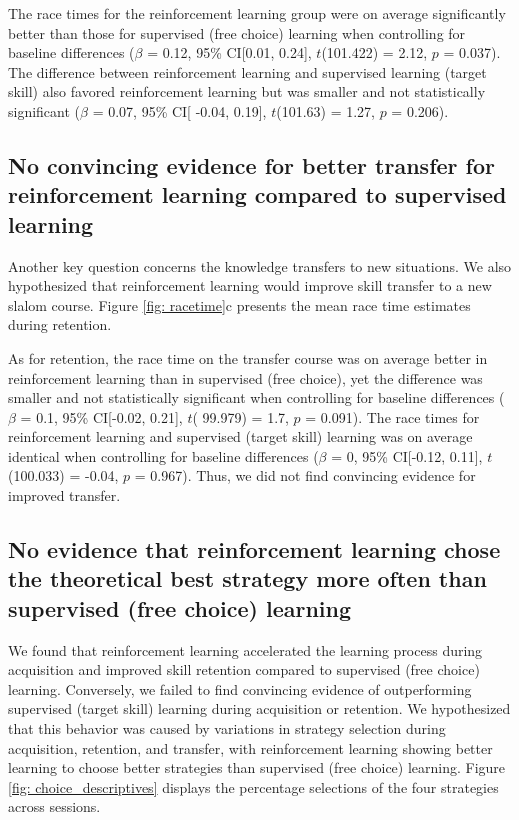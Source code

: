 \documentclass[pdflatex,sn-mathphys-num]{sn-jnl}%
\theoremstyle{thmstyleone}%
\theoremstyle{thmstyletwo}%
\theoremstyle{thmstylethree}%
\begin{document}
The race times for the reinforcement learning group were on average significantly better than those for supervised (free choice) learning when controlling for baseline differences ($\beta$ = 0.12, 95\% CI[0.01, 0.24], $t$(101.422) = 2.12, $p$ = 0.037). The difference between reinforcement learning and supervised learning (target skill) also favored reinforcement learning but was smaller and not statistically significant ($\beta$ = 0.07, 95\% CI[ -0.04, 0.19], $t$(101.63) = 1.27, $p$ = 0.206). 

\subsection{No convincing evidence for better transfer for reinforcement learning compared to supervised learning} \label{result_racetime_transfer}
Another key question concerns the knowledge transfers to new situations. We also hypothesized that reinforcement learning would improve skill transfer to a new slalom course. Figure \ref{fig: racetime}c presents the mean race time estimates during retention.

As for retention, the race time on the transfer course was on average better in reinforcement learning than in supervised (free choice), yet the difference was smaller and not statistically significant when controlling for baseline differences ($\beta$ = 0.1, 95\% CI[-0.02, 0.21], $t$( 99.979) = 1.7, $p$  = 0.091). The race times for reinforcement learning and supervised (target skill) learning was on average identical when controlling for baseline differences ($\beta$ = 0, 95\% CI[-0.12, 0.11], $t$(100.033) = -0.04, $p$ = 0.967). Thus, we did not find convincing evidence for improved transfer.


\subsection{No evidence that reinforcement learning chose the theoretical best strategy more often than supervised (free choice) learning}\label{subsubsec3}
We found that reinforcement learning accelerated the learning process during acquisition and improved skill retention compared to supervised (free choice) learning. Conversely, we failed to find convincing evidence of outperforming supervised (target skill) learning during acquisition or retention. We hypothesized that this behavior was caused by variations in strategy selection during acquisition, retention, and transfer, with reinforcement learning showing better learning to choose better strategies than supervised (free choice) learning. Figure \ref{fig: choice_descriptives} displays the percentage selections of the four strategies across sessions.
\end{document}
